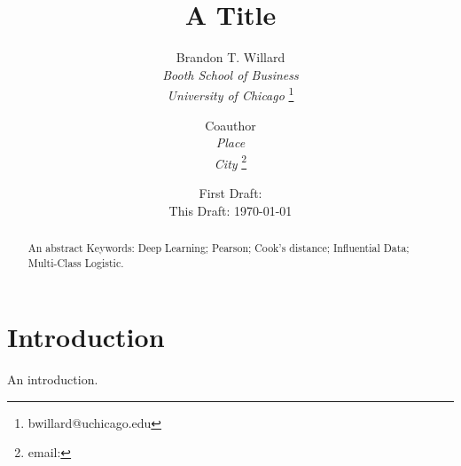 \documentclass[12pt]{article}
\title{A Title}
\author{
  Brandon T. Willard \\
  \textit{Booth School of Business} \\
  \textit{University of Chicago} 
  \footnote{bwillard@uchicago.edu } 
  \and
  Coauthor \\
  \textit{Place} \\
  \textit{City} 
  \footnote{ email: }
}
\date{
  First Draft: \\
  This Draft: \monthyear\today{}
}
\begin{document}
\maketitle
\begin{abstract}
  \noindent 
  An abstract
  \vspace{0.1in}
  \noindent Keywords: Deep Learning; Pearson; Cook's distance; Influential
  Data; Multi-Class Logistic.
\end{abstract}

\newpage
\singlespacing
\section{Introduction}

An introduction.

\newpage



\begin{appendix}
\end{appendix}
\end{document}
